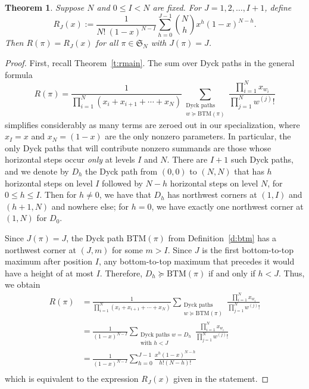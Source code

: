 \documentclass[11pt]{amsart}   %
\newtheorem{theorem}{Theorem}[section]
\theoremstyle{definition}
\theoremstyle{remark}
\numberwithin{equation}{section}
\theoremstyle{theorem}
\renewcommand{\S}{\mathcal{S}}
\renewcommand{\S}{\mathfrak{S}}
\newcommand{\BTM}{\mathrm{BTM}}
\begin{document}
\begin{theorem}\label{t:1main}
Suppose $N$ and $0 \leq I < N$ are fixed.  For $J = 1, 2, \ldots, I+1$, define 
\[ R_J(x) := \frac{1}{N!\ (1-x)^{N-I}} \sum_{h=0}^{J-1} {N \choose h} x^h(1-x)^{N-h}. \]
Then $R(\pi) = R_J(x)$ for all $\pi \in \S_N$ with $J(\pi)=J$.
\end{theorem}
\begin{proof}
First, recall Theorem~\ref{t:rmain}.  The sum over Dyck paths in the general formula 
    \[ R(\pi) = \frac{1}{\prod_{i=1}^N (x_i + x_{i+1} + \cdots + x_N)} \sum_{\substack{ \text{Dyck paths }\\ w \succcurlyeq \mathrm{BTM}(\pi)}} \frac{ \prod_{i=1}^N x_{w_i} }{\prod_{j=1}^N w^{(j)}!} \]
simplifies considerably as many terms are zeroed out in our specialization, where $x_I = x$ and $x_N = (1-x)$ are the only nonzero parameters.  In particular, the only Dyck paths that will contribute nonzero summands are those whose horizontal steps occur {\em only} at levels $I$ and $N$.  There are $I+1$ such Dyck paths, and we denote by $D_h$ the Dyck path from $(0,0)$ to $(N,N)$ that has $h$ horizontal steps on level $I$ followed by $N-h$ horizontal steps on level $N$, for $0 \leq h \leq I$.  Then for $h \neq 0$, we have that $D_h$ has northwest corners at $(1,I)$ and $(h+1,N)$ and nowhere else; for $h = 0$, we have exactly one northwest corner at $(1,N)$ for $D_0$. 

Since $J(\pi) = J$, the Dyck path $\BTM(\pi)$ from Definition~\ref{d:btm} has a northwest corner at $(J, m)$ for some $m > I$.  Since $J$ is the first bottom-to-top maximum after position $I$, any bottom-to-top maximum that precedes it would have a height of at most $I$.  Therefore, $D_h \succcurlyeq \BTM(\pi)$ if and only if $h < J$.  Thus, we obtain 
\begin{align*}
  R(\pi) &= \frac{1}{\prod_{i=1}^N (x_i + x_{i+1} + \cdots + x_N)} \sum_{\substack{ \text{Dyck paths }\\ w \succcurlyeq \mathrm{BTM}(\pi)}} \frac{ \prod_{i=1}^N x_{w_i} }{\prod_{j=1}^N w^{(j)}!}\\
  &= \frac{1}{(1-x)^{N-I}} \sum_{\substack{ \text{Dyck paths } w = D_h\\ \text{with } h < J} } \frac{ \prod_{i=1}^N x_{w_i} }{\prod_{j=1}^N w^{(j)}!}\\
         &= \frac{1}{(1-x)^{N-I}} \sum_{h=0}^{J-1} \frac{x^h(1-x)^{N-h}}{h!(N-h)!}\\
\end{align*}
which is equivalent to the expression $R_J(x)$ given in the statement.
\end{proof}
\end{document}
